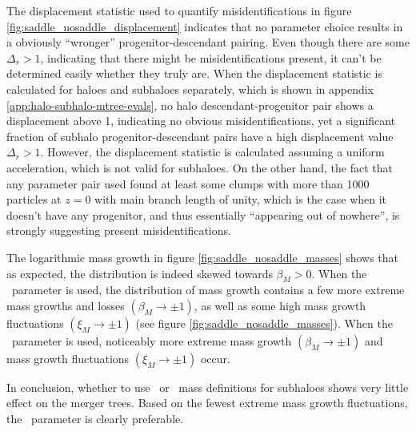 The displacement statistic used to quantify misidentifications in figure \ref{fig:saddle_nosaddle_displacement} indicates that no parameter choice results in a obviously ``wronger'' progenitor-descendant pairing.
Even though there are some  $\Delta_r > 1$, indicating that there might be misidentifications present, it can't be determined easily whether they truly are.
When the displacement statistic is calculated for haloes and subhaloes separately, which is shown in appendix \ref{app:halo-subhalo-mtree-evals}, no halo descendant-progenitor pair shows a displacement above 1, indicating no obvious misidentifications, yet a significant fraction of subhalo progenitor-descendant pairs have a high displacement value $\Delta_r > 1$.
However, the displacement statistic is calculated assuming a uniform acceleration, which is not valid for subhaloes.
On the other hand, the fact that any parameter pair used found at least some clumps with more than 1000 particles at $z=0$ with main branch length of unity, which is the case when it doesn't have any progenitor, and thus essentially ``appearing out of nowhere'', is strongly suggesting present misidentifications.





The logarithmic mass growth in figure \ref{fig:saddle_nosaddle_masses} shows that as expected, the distribution is indeed skewed towards $\beta_M > 0$. 
When the \inc\ parameter is used, the distribution of mass growth contains a few more extreme mass growths and losses $(\beta_M \rightarrow \pm 1)$, as well as some high mass growth fluctuations $(\xi_M \rightarrow \pm 1)$ (see figure \ref{fig:saddle_nosaddle_masses}).
When the \nosad\ parameter is used, noticeably more extreme mass growth $(\beta_M \rightarrow \pm 1)$ and mass growth fluctuations $(\xi_M \rightarrow \pm 1)$ occur.






In conclusion, whether to use \inc\ or \exc\ mass definitions for subhaloes shows very little effect on the merger trees.
Based on the fewest extreme mass growth fluctuations, the \sad\ parameter is clearly preferable. 





